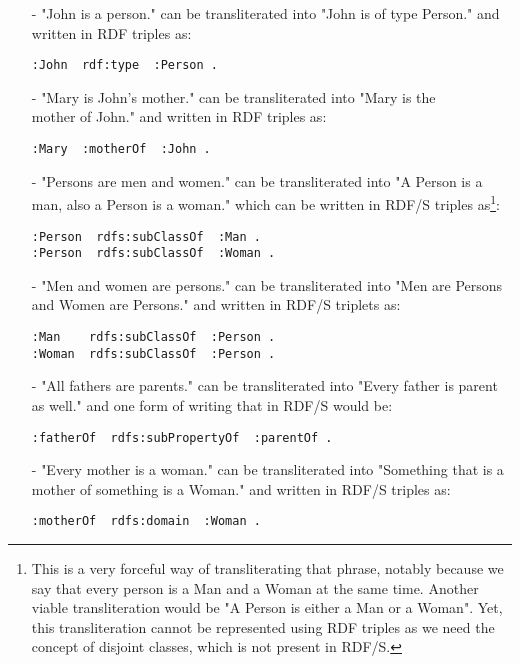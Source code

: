 \documentclass[a4paper,12pt]{article}
\begin{document}
\begin{itemize}
\item[-]"John is a person." can be transliterated into "John is of type Person." and
written in RDF triples as:
\begin{Verbatim}[samepage=true]
:John  rdf:type  :Person .
\end{Verbatim}

\item[-]"Mary is John’s mother." can be transliterated into "Mary is the\\
mother of John." and written in RDF triples as:
\begin{Verbatim}[samepage=true]
:Mary  :motherOf  :John .
\end{Verbatim}

\item[-]"Persons are men and women." can be transliterated into "A Person is a man,
also a Person is a woman." which can be written in RDF/S triples
as\footnote{This is a very forceful way of transliterating that phrase, notably
because we say that every person is a Man and a Woman at the same time.
Another viable transliteration would be "A Person is either a Man or a Woman".
Yet, this transliteration cannot be represented using RDF triples as we need
the concept of disjoint classes, which is not present in RDF/S.}:
\begin{Verbatim}[samepage=true]
:Person  rdfs:subClassOf  :Man .
:Person  rdfs:subClassOf  :Woman .
\end{Verbatim}

\item[-]"Men and women are persons." can be transliterated into "Men are Persons and
Women are Persons." and written in RDF/S triplets as:
\begin{Verbatim}[samepage=true]
:Man    rdfs:subClassOf  :Person .
:Woman  rdfs:subClassOf  :Person .
\end{Verbatim}

\item[-]"All fathers are parents." can be transliterated into "Every father is parent
as well." and one form of writing that in RDF/S would be:
\begin{Verbatim}[samepage=true]
:fatherOf  rdfs:subPropertyOf  :parentOf .
\end{Verbatim}

\item[-]"Every mother is a woman." can be transliterated into "Something that is a
mother of something is a Woman." and written in RDF/S triples as:
\begin{Verbatim}[samepage=true]
:motherOf  rdfs:domain  :Woman .
\end{Verbatim}


\end{itemize}
\end{document}
